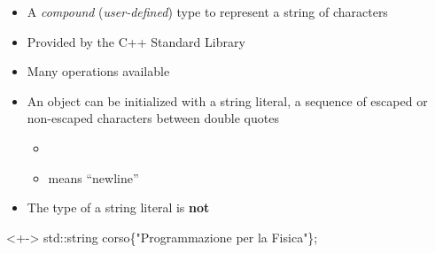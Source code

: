 \begin{frame}[fragile]{}

  \begin{itemize}[<+->]

  \item A \textit{compound} (\textit{user-defined}) type to represent a
    string of characters
  \item Provided by the C++ Standard Library
  \item Many operations available
  \item An  object can be initialized with a string literal, a
    sequence of escaped or non-escaped characters between double quotes
    \begin{itemize}[<.->]
    \item {}
    \item {} means ``newline''
    \end{itemize}
  \item The type of a string literal is \textbf{not} 
  \end{itemize}

  \begin{codeblock}<+->{
std::string corso\{"Programmazione per la Fisica"\};
}\end{codeblock}


\end{frame}

